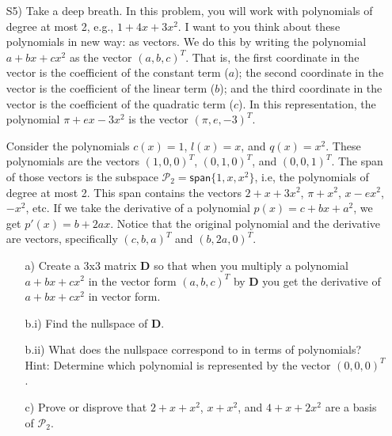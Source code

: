 \documentclass[12pt]{article}
\begin{document}
\begin{itemize}
\item[S5)] Take a deep breath.  In this problem, you will work with polynomials of degree at most 2, e.g., $1+4x+3x^2$. I want to you think about these polynomials in new way: as vectors.  We do this by writing the polynomial $a+bx+cx^2$ as the vector $(a,b,c)^T$.  That is, the first coordinate in the vector is the coefficient of the constant term ($a$); the second coordinate in the vector is the coefficient of the linear term ($b$); and the third coordinate in the vector is the coefficient of the quadratic term ($c$).  In this representation, the polynomial $\pi+ex-3x^2$ is the vector $(\pi,e,-3)^T$.  

Consider the polynomials $c(x)=1$, $l(x)=x$, and $q(x)=x^2$.  These polynomials are the vectors $(1,0,0)^T$, $(0,1,0)^T$, and $(0,0,1)^T$. The span of those vectors is the subspace $\mathcal{P}_2=\textsf{span}\{1,x,x^2\}$, i.e, the polynomials of degree at most 2.  This span contains the vectors $2+x+3x^2$, $\pi + x^2$, $x - ex^2$, $-x^2$, etc.   If we take the derivative of a polynomial $p(x) =c+bx+a^2$, we get $p'(x)=b+2ax$.  Notice that the original polynomial and the derivative are vectors, specifically $(c,b,a)^T$ and $(b,2a,0)^T$. 

\begin{itemize}
\item[a)] Create a 3x3 matrix $\mathbf{D}$ so that when you multiply a polynomial $a+bx+cx^2$ in the vector form $(a,b,c)^T$ by $\mathbf{D}$ you get the derivative of  $a+bx+cx^2$ in vector form.

\item[b.i)] Find the nullspace of $\mathbf{D}$. 
\item[b.ii)] What does the nullspace correspond to in terms of polynomials?  Hint: Determine which polynomial is represented by the vector $(0,0,0)^T$. 

\item[c)] Prove or disprove that $2+x+x^2$, $x+x^2$, and $4+x+2x^2$ are a basis of  $\mathcal{P}_2$. 
\end{itemize}


\end{itemize}
\end{document}
